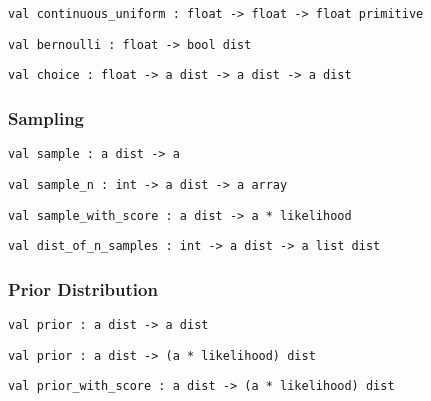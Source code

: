 \protect\hyperlink{val-continuousux5funiform}{}\texttt{val\ continuous\_uniform\ :\ float\ -\textgreater{}\ float\ -\textgreater{}\ float\ primitive}

\protect\hyperlink{val-bernoulli}{}\texttt{val\ bernoulli\ :\ float\ -\textgreater{}\ bool\ dist}

\protect\hyperlink{val-choice}{}\texttt{val\ choice\ :\ float\ -\textgreater{}\ \textquotesingle{}a\ dist\ -\textgreater{}\ \textquotesingle{}a\ dist\ -\textgreater{}\ \textquotesingle{}a\ dist}

\hypertarget{distux5fsample}{\subsubsection{\texorpdfstring{\protect\hyperlink{distux5fsample}{}Sampling}{Sampling}}\label{distux5fsample}}

\protect\hyperlink{val-sample}{}\texttt{val\ sample\ :\ \textquotesingle{}a\ dist\ -\textgreater{}\ \textquotesingle{}a}

\protect\hyperlink{val-sampleux5fn}{}\texttt{val\ sample\_n\ :\ int\ -\textgreater{}\ \textquotesingle{}a\ dist\ -\textgreater{}\ \textquotesingle{}a\ array}

\protect\hyperlink{val-sampleux5fwithux5fscore}{}\texttt{val\ sample\_with\_score\ :\ \textquotesingle{}a\ dist\ -\textgreater{}\ \textquotesingle{}a\ *\ likelihood}

\protect\hyperlink{val-distux5fofux5fnux5fsamples}{}\texttt{val\ dist\_of\_n\_samples\ :\ int\ -\textgreater{}\ \textquotesingle{}a\ dist\ -\textgreater{}\ \textquotesingle{}a\ list\ dist}

\hypertarget{prior}{\subsubsection{\texorpdfstring{\protect\hyperlink{prior}{}Prior
Distribution}{Prior Distribution}}\label{prior}}

\protect\hyperlink{val-priorux27}{}\texttt{val\ prior\textquotesingle{}\ :\ \textquotesingle{}a\ dist\ -\textgreater{}\ \textquotesingle{}a\ dist}

\protect\hyperlink{val-prior}{}\texttt{val\ prior\ :\ \textquotesingle{}a\ dist\ -\textgreater{}\ (\textquotesingle{}a\ *\ likelihood)\ dist}

\protect\hyperlink{val-priorux5fwithux5fscore}{}\texttt{val\ prior\_with\_score\ :\ \textquotesingle{}a\ dist\ -\textgreater{}\ (\textquotesingle{}a\ *\ likelihood)\ dist}

